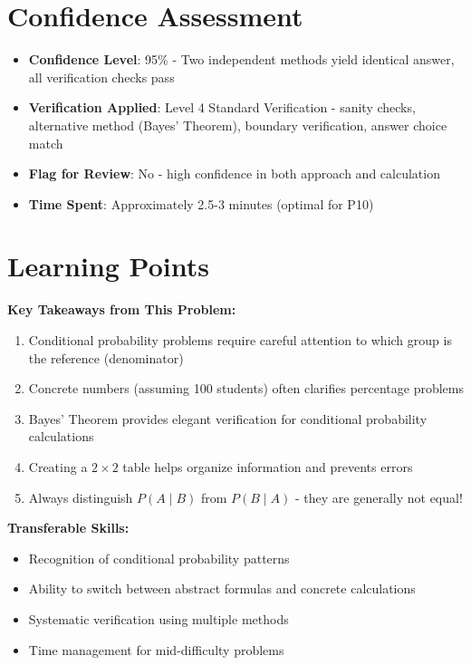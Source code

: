 \documentclass[]{article}
\begin{document}
\section*{Confidence Assessment}
\begin{itemize}[leftmargin=*]
    \item \textbf{Confidence Level}: 95\% - Two independent methods yield identical answer, all verification checks pass
    
    \item \textbf{Verification Applied}: Level 4 Standard Verification - sanity checks, alternative method (Bayes' Theorem), boundary verification, answer choice match
    
    \item \textbf{Flag for Review}: No - high confidence in both approach and calculation
    
    \item \textbf{Time Spent}: Approximately 2.5-3 minutes (optimal for P10)
\end{itemize}

\section*{Learning Points}

\textbf{Key Takeaways from This Problem:}
\begin{enumerate}
    \item Conditional probability problems require careful attention to which group is the reference (denominator)
    \item Concrete numbers (assuming 100 students) often clarifies percentage problems
    \item Bayes' Theorem provides elegant verification for conditional probability calculations
    \item Creating a $2 \times 2$ table helps organize information and prevents errors
    \item Always distinguish $P(A \mid B)$ from $P(B \mid A)$ - they are generally not equal!
\end{enumerate}

\textbf{Transferable Skills:}
\begin{itemize}
    \item Recognition of conditional probability patterns
    \item Ability to switch between abstract formulas and concrete calculations
    \item Systematic verification using multiple methods
    \item Time management for mid-difficulty problems
\end{itemize}
\end{document}
